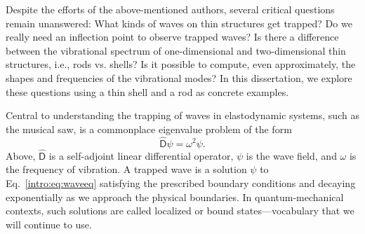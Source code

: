Despite the efforts of the above-mentioned authors, several critical questions remain unanswered: 
What kinds of waves on thin structures get trapped?
Do we really need an inflection point to observe trapped waves?  Is there a difference between the vibrational spectrum of one-dimensional and two-dimensional thin structures, i.e., rods vs. shells?
Is it possible to compute, even approximately, the shapes and frequencies of the vibrational modes?
In this dissertation, we explore these questions using a thin shell and a rod as concrete examples.

Central to understanding the trapping of waves in elastodynamic systems, such as the musical saw, is a commonplace eigenvalue problem of the form
%
\begin{equation}
  \widehat{\mathsf{D}}\psi = \omega^{2}\psi.
  \label{intro:eq:waveeq}
\end{equation}
%
Above, $\widehat{\mathsf{D}}$ is a self-adjoint linear differential operator, $\psi$ is the wave field, and $\omega$ is the frequency of vibration.
A trapped wave is a solution $\psi$ to Eq.~\eqref{intro:eq:waveeq} satisfying the prescribed boundary conditions and decaying exponentially as we approach the physical boundaries.
In quantum-mechanical contexts, such solutions are called localized or bound states---vocabulary that we will continue to use.

